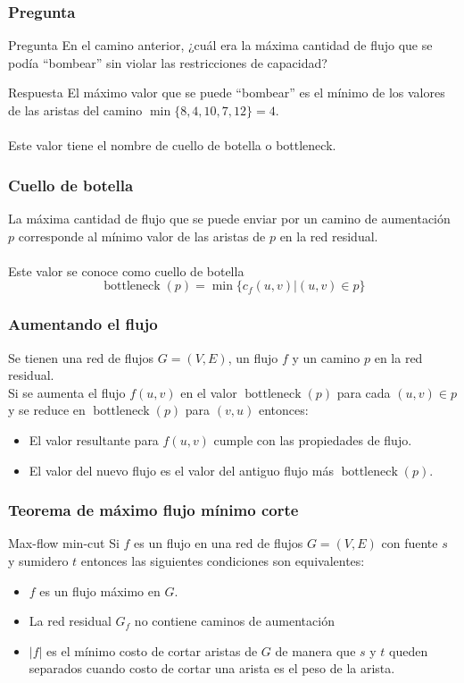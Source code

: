 \documentclass{beamer}
\begin{document}
	\begin{frame}
		\frametitle{Pregunta}
		\begin{alertblock}{Pregunta}
			En el camino anterior, ¿cuál era la máxima cantidad de flujo que se podía ``bombear'' sin violar las restricciones de capacidad?
		\end{alertblock}
		\pause
		\begin{exampleblock}{Respuesta}
			El máximo valor que se puede ``bombear'' es el mínimo de los valores de las aristas del camino $\operatorname{min}\{8, 4, 10, 7, 12\} = 4$.\\ \quad \\
			Este valor tiene el nombre de cuello de botella o bottleneck.
		\end{exampleblock}
	\end{frame}

	\begin{frame}
		\frametitle{Cuello de botella}
		La máxima cantidad de flujo que se puede enviar por un camino de aumentación $p$ corresponde al mínimo valor de las aristas de $p$ en la red residual.\\ \quad \\
		Este valor se conoce como cuello de botella $$\operatorname{bottleneck}(p) = \operatorname{min}\{c_f(u,v) | (u,v) \in p\}$$
	\end{frame}

	\begin{frame}
		\frametitle{Aumentando el flujo}
		Se tienen una red de flujos $G = (V, E)$, un flujo $f$ y un camino $p$ en la red residual.\\
	
		Si se aumenta el flujo $f(u,v)$ en el valor $\operatorname{bottleneck}(p)$ para cada $(u,v) \in p$ y se reduce en $\operatorname{bottleneck}(p)$ para $(v,u)$ entonces:
		\begin{itemize}
			\item El valor resultante para $f(u,v)$ cumple con las propiedades de flujo.
			\item El valor del nuevo flujo es el valor del antiguo flujo más $\operatorname{bottleneck}(p)$.
		\end{itemize}
	\end{frame}
	
	
	
	\begin{frame}
		\frametitle{Teorema de máximo flujo mínimo corte}
		\begin{block}{Max-flow min-cut}
			Si $f$ es un flujo en una red de flujos $G = (V, E)$ con fuente $s$ y sumidero $t$ entonces las siguientes condiciones son equivalentes:
			\begin{itemize}
				\item $f$ es un flujo máximo en $G$.
				\item La red residual $G_f$ no contiene caminos de aumentación
				\item $|f|$ es el mínimo costo de cortar aristas de $G$ de manera que $s$ y $t$ queden separados cuando costo de cortar una arista es el peso de la arista.
			\end{itemize}
		\end{block}
	\end{frame}
\end{document}
